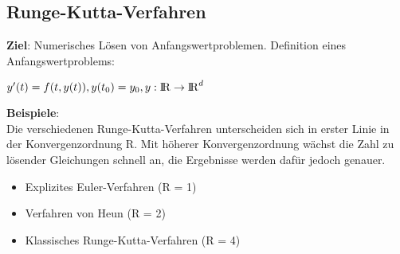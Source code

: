 \documentclass[10pt,a4paper]{article}
\def\realnumbers{{\rm I\!R}}
\begin{document}
	\subsection{Runge-Kutta-Verfahren}
	\textbf{Ziel}: Numerisches Lösen von Anfangswertproblemen. Definition eines Anfangswertproblems:
	\begin{center}
		$y'(t) = f(t, y(t)), y(t_0) = y_0, y: \realnumbers \rightarrow \realnumbers^d$
	\end{center}
	\textbf{Beispiele}:\\
	Die verschiedenen Runge-Kutta-Verfahren unterscheiden sich in erster Linie in der Konvergenzordnung R. Mit höherer Konvergenzordnung wächst die Zahl zu lösender Gleichungen schnell an, die Ergebnisse werden dafür jedoch genauer.
	\begin{itemize}
		\item Explizites Euler-Verfahren (R = 1)
		\item Verfahren von Heun (R = 2)
		\item Klassisches Runge-Kutta-Verfahren (R = 4)
	\end{itemize}
\end{document}
